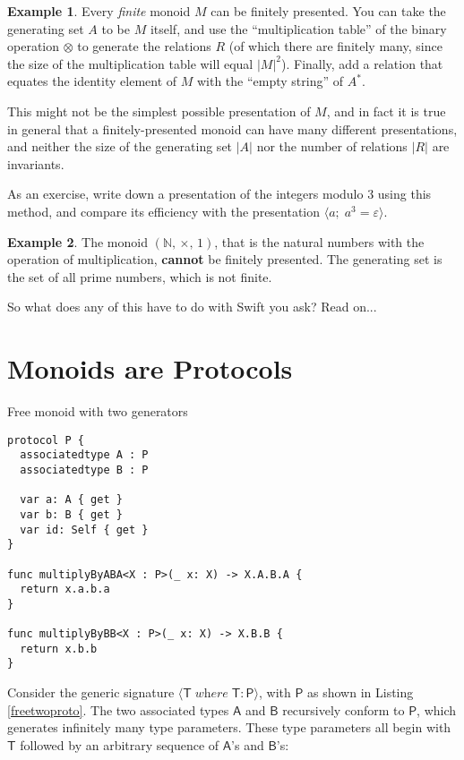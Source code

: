 \documentclass[headsepline,bibliography=totoc]{scrreport}
\newcommand{\namesym}[1]{\mathsf{#1}}
\newcommand{\genericparam}[1]{\bm{\mathsf{#1}}}
\newcommand{\proto}[1]{\bm{\mathsf{#1}}}
\newcommand{\gensig}[2]{\langle #1\;\textit{where}\;#2\rangle}
\theoremstyle{definition}
\newtheorem{example}{Example}[chapter]
\theoremstyle{definition}
\theoremstyle{definition}
\begin{document}
\begin{example} Every \emph{finite} monoid $M$ can be finitely presented. You can take the generating set $A$ to be $M$ itself, and use the ``multiplication table'' of the binary operation $\otimes$ to generate the relations $R$ (of which there are finitely many, since the size of the multiplication table will equal $|M|^2$). Finally, add a relation that equates the identity element of $M$ with the ``empty string'' of $A^*$.

This might not be the simplest possible presentation of $M$, and in fact it is true in general that a finitely-presented monoid can have many different presentations, and neither the size of the generating set $|A|$ nor the number of relations $|R|$ are invariants.

As an exercise, write down a presentation of the integers modulo 3 using this method, and compare its efficiency with the presentation $\langle a;\;a^3=\varepsilon\rangle$.
\end{example}

\begin{example} The monoid $(\mathbb{N},\,\times,\,1)$, that is the natural numbers with the operation of multiplication, \textbf{cannot} be finitely presented. The generating set is the set of all prime numbers, which is not finite.
\end{example}

So what does any of this have to do with Swift you ask? Read on...

\chapter{Monoids are Protocols}\label{monoidsasprotocols}
\begin{listing}\caption{Free monoid with two generators}\label{freetwoproto}
\begin{Verbatim}
protocol P {
  associatedtype A : P
  associatedtype B : P

  var a: A { get }
  var b: B { get }
  var id: Self { get }
}

func multiplyByABA<X : P>(_ x: X) -> X.A.B.A {
  return x.a.b.a
}

func multiplyByBB<X : P>(_ x: X) -> X.B.B {
  return x.b.b
}
\end{Verbatim}
\end{listing}

Consider the generic signature $\gensig{\genericparam{T}}{\genericparam{T}\colon\proto{P}}$, with $\proto{P}$ as shown in Listing \ref{freetwoproto}. The two associated types $\namesym{A}$ and $\namesym{B}$ recursively conform to $\proto{P}$, which generates infinitely many type parameters. These type parameters all begin with $\genericparam{T}$ followed by an arbitrary sequence of $\namesym{A}$'s and $\namesym{B}$'s:
\end{document}
